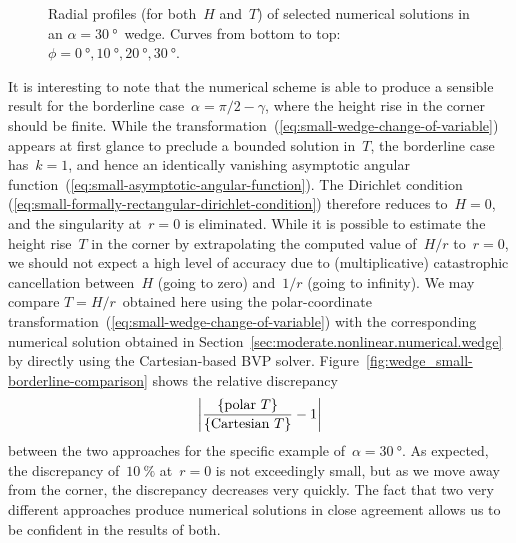\begin{figure}
  \newcommand*{\subfigurewidth}{0.45\textwidth}
  \centering
  \begin{subfigure}[t]{\subfigurewidth}
  \end{subfigure}
    \hfill
  \begin{subfigure}[t]{\subfigurewidth}
  \end{subfigure}
  \caption{
    Radial profiles (for both~$H$ and~$T$) of selected numerical solutions
    in an $\alpha = \SI{30}{\degree}$~wedge.
    Curves from bottom to top:
    $\phi =
      \SI{0}{\degree}, \SI{10}{\degree},
      \SI{20}{\degree}, \SI{30}{\degree}$.
  }
  \label{fig:wedge_small-solution}
\end{figure}

It is interesting to note that
the numerical scheme is able to produce a sensible result
for the borderline case~$\alpha = \pi/2 - \gamma$,
where the height rise in the corner should be finite.
While the transformation~(\ref{eq:small-wedge-change-of-variable})
appears at first glance to preclude a bounded solution in~$T$,
the borderline case has~$k = 1$,
and hence an identically vanishing
asymptotic angular function~(\ref{eq:small-asymptotic-angular-function}).
The Dirichlet condition~%
  (\ref{eq:small-formally-rectangular-dirichlet-condition})
therefore reduces to~$H = 0$,
and the singularity at~$r = 0$ is eliminated.
While it is possible to estimate the height rise~$T$ in the corner
by extrapolating the computed value of~$H / r$ to~$r = 0$,
we should not expect a high level of accuracy
due to (multiplicative) catastrophic cancellation
between~$H$ (going to zero) and~$1 / r$ (going to infinity).
We may compare $T = H / r$~obtained here using
the polar-coordinate transformation~(\ref{eq:small-wedge-change-of-variable})
with the corresponding numerical solution
obtained in Section~\ref{sec:moderate.nonlinear.numerical.wedge}
by directly using the Cartesian-based BVP solver.
Figure~\ref{fig:wedge_small-borderline-comparison}
shows the relative discrepancy
\begin{equation}
  \abs*{\frac{\textq{polar~$T$}}{\textq{Cartesian~$T$}} - 1}
  \label{eq:wedge_small-relative-discrepancy-with-cartesian}
\end{equation}
between the two approaches
for the specific example of~$\alpha = \SI{30}{\degree}$.
As expected,
the discrepancy of~$\SI{10}{\percent}$ at~$r = 0$
is not exceedingly small,
but as we move away from the corner,
the discrepancy decreases very quickly.
The fact that two very different approaches
produce numerical solutions in close agreement
allows us to be confident in the results of both.

